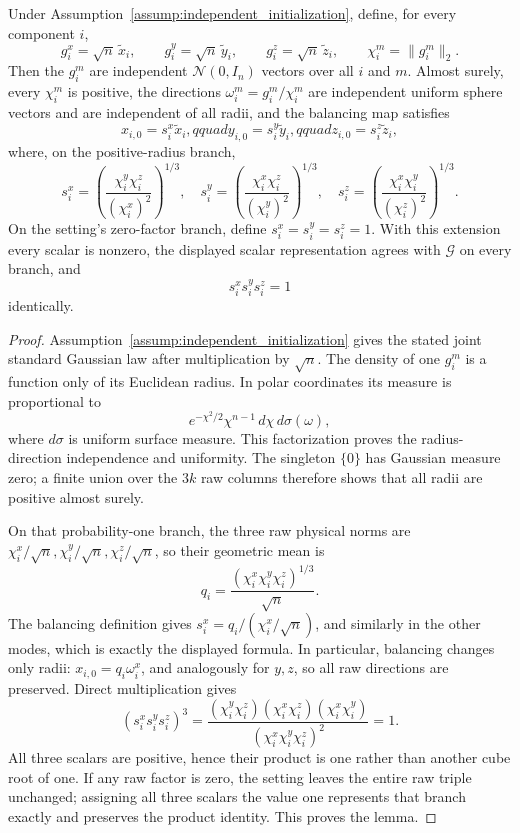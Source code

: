 \begin{lemma}
\label{lem:step-002-balancing-scalars}
Under Assumption~\ref{assump:independent_initialization}, define, for every
component \(i\),
\[
  g_i^x=\sqrt n\,\widetilde x_i,
  \qquad g_i^y=\sqrt n\,\widetilde y_i,
  \qquad g_i^z=\sqrt n\,\widetilde z_i,
  \qquad \chi_i^m=\|g_i^m\|_2.
\]
Then the \(g_i^m\) are independent \(\mathcal N(0,I_n)\) vectors over all
\(i\) and \(m\). Almost surely, every \(\chi_i^m\) is positive, the directions
\(\omega_i^m=g_i^m/\chi_i^m\) are independent uniform sphere vectors and are
independent of all radii, and the balancing map satisfies
\[
  x_{i,0}=s_i^x\widetilde x_i,qquad
  y_{i,0}=s_i^y\widetilde y_i,qquad
  z_{i,0}=s_i^z\widetilde z_i,
\]
where, on the positive-radius branch,
\[
  s_i^x=\left(\frac{\chi_i^y\chi_i^z}{(\chi_i^x)^2}\right)^{1/3},
  \quad
  s_i^y=\left(\frac{\chi_i^x\chi_i^z}{(\chi_i^y)^2}\right)^{1/3},
  \quad
  s_i^z=\left(\frac{\chi_i^x\chi_i^y}{(\chi_i^z)^2}\right)^{1/3}.
\]
On the setting's zero-factor branch, define
\(s_i^x=s_i^y=s_i^z=1\). With this extension every scalar is nonzero, the
displayed scalar representation agrees with \(\mathcal G\) on every branch,
and
\[
  s_i^x s_i^y s_i^z=1
\]
identically.

\end{lemma}

\begin{proof}
Assumption~\ref{assump:independent_initialization}
gives the stated joint standard Gaussian law after multiplication by
\(\sqrt n\). The density of one \(g_i^m\) is a function only of its Euclidean
radius. In polar coordinates its measure is proportional to
\[
  e^{-\chi^2/2}\chi^{n-1}\,d\chi\,d\sigma(\omega),
\]
where \(d\sigma\) is uniform surface measure. This factorization proves the
radius-direction independence and uniformity. The singleton \(\{0\}\) has
Gaussian measure zero; a finite union over the \(3k\) raw columns therefore
shows that all radii are positive almost surely.

On that probability-one branch, the three raw physical norms are
\(\chi_i^x/\sqrt n,\chi_i^y/\sqrt n,\chi_i^z/\sqrt n\), so their geometric
mean is
\[
  q_i=\frac{(\chi_i^x\chi_i^y\chi_i^z)^{1/3}}{\sqrt n}.
\]
The balancing definition gives
\(s_i^x=q_i/(\chi_i^x/\sqrt n)\), and similarly in the other modes, which is
exactly the displayed formula. In particular, balancing changes only radii:
\(x_{i,0}=q_i\omega_i^x\), and analogously for \(y,z\), so all raw directions
are preserved. Direct multiplication gives
\[
  (s_i^x s_i^y s_i^z)^3
  =\frac{(\chi_i^y\chi_i^z)(\chi_i^x\chi_i^z)
          (\chi_i^x\chi_i^y)}
         {(\chi_i^x\chi_i^y\chi_i^z)^2}
  =1.
\]
All three scalars are positive, hence their product is one rather than another
cube root of one. If any raw factor is zero, the setting leaves the entire raw
triple unchanged; assigning all three scalars the value one represents that
branch exactly and preserves the product identity. This proves the lemma.


\end{proof}


